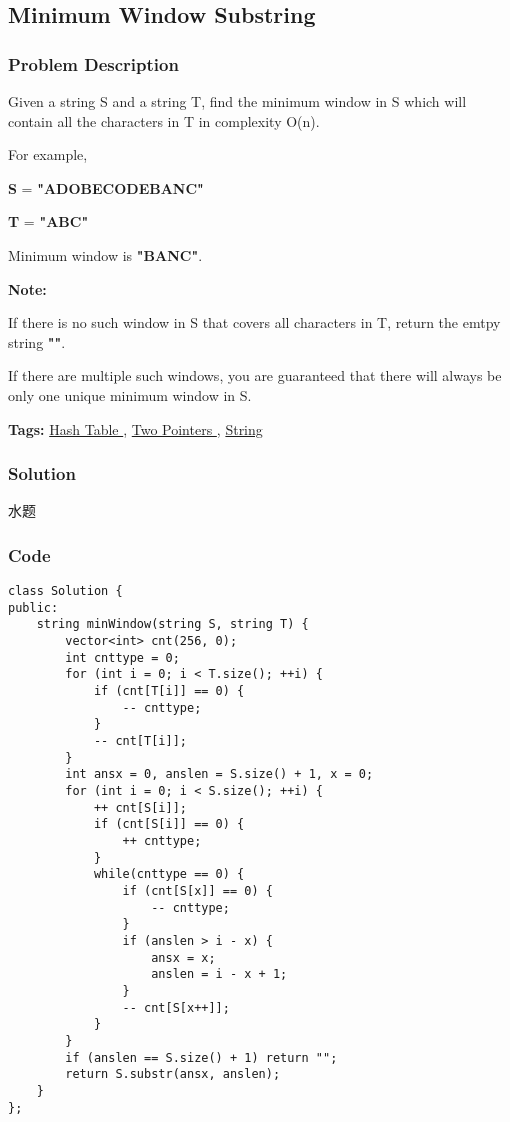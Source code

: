 \documentclass{article}
\begin{document}
\begin{CJK*}{UTF8}{gkai}
\subsection{ Minimum Window Substring }
\label{ Minimum Window Substring }

\subsubsection*{Problem Description}
Given a string S and a string T, find the minimum window in S which will contain all the characters in T in complexity O(n).

For example,


\textbf{S} = \textbf{"ADOBECODEBANC"}


\textbf{T} = \textbf{"ABC"}

Minimum window is \textbf{"BANC"}.

\textbf{Note:}


If there is no such window in S that covers all characters in T, return the emtpy string \textbf{""}.

If there are multiple such windows, you are guaranteed that there will always be only one unique minimum window in S.


\textbf{Tags: }
\hyperref[ Hash Table ]{ Hash Table },  \hyperref[ Two Pointers ]{ Two Pointers },  \hyperref[ String ]{ String }



\subsubsection*{Solution}
水题

\subsubsection*{Code}
\begin{lstlisting}
class Solution {
public:
    string minWindow(string S, string T) {
        vector<int> cnt(256, 0);
        int cnttype = 0;
        for (int i = 0; i < T.size(); ++i) {
            if (cnt[T[i]] == 0) {
                -- cnttype;
            }
            -- cnt[T[i]];
        }
        int ansx = 0, anslen = S.size() + 1, x = 0;
        for (int i = 0; i < S.size(); ++i) {
            ++ cnt[S[i]];
            if (cnt[S[i]] == 0) {
                ++ cnttype;
            }
            while(cnttype == 0) {
                if (cnt[S[x]] == 0) {
                    -- cnttype;
                }
                if (anslen > i - x) {
                    ansx = x;
                    anslen = i - x + 1;
                }
                -- cnt[S[x++]];
            }
        }
        if (anslen == S.size() + 1) return "";
        return S.substr(ansx, anslen);
    }
}; 
\end{lstlisting}



\end{CJK*}
\end{document}
